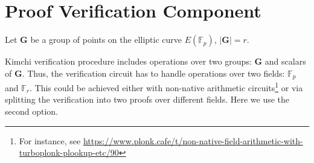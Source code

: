 \section{Proof Verification Component}
\label{section:two-circuits}

Let $\textbf{G}$ be a group of points on the elliptic curve $E(\mathbb{F}_p)$, $|\textbf{G}| = r$.

Kimchi verification procedure includes operations over two groups: $\textbf{G}$ and scalars of $\textbf{G}$. 
Thus, the verification circuit has to handle operations over two fields: $\mathbb{F}_p$ and $\mathbb{F}_r$.
This could be achieved either with non-native arithmetic circuits\footnote{For instance, see \url{https://www.plonk.cafe/t/non-native-field-arithmetic-with-turboplonk-plookup-etc/90}}
or via splitting the verification into two proofs over different fields. 
Here we use the second option. 

